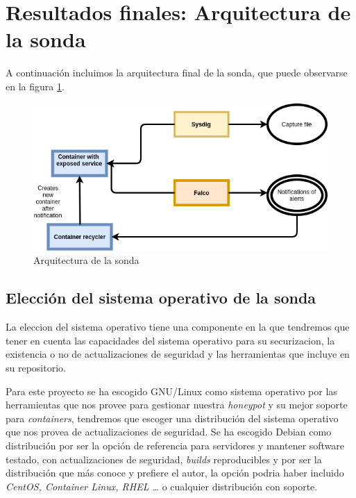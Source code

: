 \section{Resultados finales: Arquitectura de la sonda}

A continuación incluimos la arquitectura final de la sonda, que puede observarse en la figura \ref{fig:arquitectura-sonda}.

\begin{figure}[h]
    \centering
      \includegraphics[scale=0.5]{images/probe_architecture}
    \caption{Arquitectura de la sonda}
    \label{fig:arquitectura-sonda}
  \end{figure}

\subsection{Elección del sistema operativo de la sonda}
\label{subsec:sonda-so}
  
La eleccion del sistema operativo tiene una componente en la que tendremos que tener en cuenta las capacidades del sistema operativo para su securizacion,
la existencia o no de actualizaciones de seguridad y las herramientas que incluye en su repositorio.

Para este proyecto se ha escogido GNU/Linux como sistema operativo por las herramientas que nos provee para gestionar nuestra \emph{honeypot} y su mejor soporte
para \emph{containers}, tendremos que escoger una distribución del sistema operativo que nos provea de actualizaciones de seguridad. 
Se ha escogido Debian como distribución por ser la opción de referencia para servidores y mantener software testado, con actualizaciones de seguridad, 
\emph{builds} reproducibles y por ser la distribución que más conoce y prefiere el autor,
 la opción podria haber incluido \emph{CentOS, Container Linux, RHEL \ldots} o cualquier distribución con soporte. 


